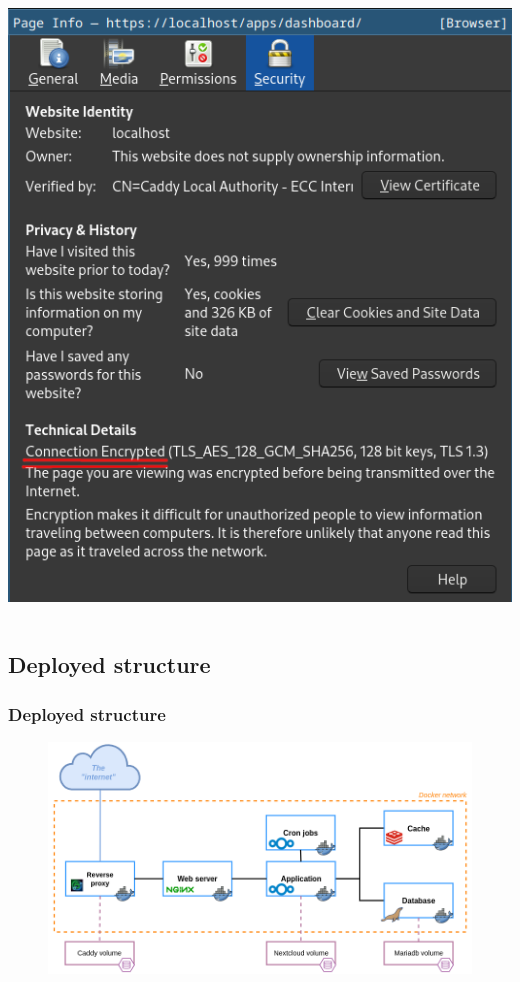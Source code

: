 \documentclass{beamer}
\begin{document}
\begin{frame}
\begin{columns}
\begin{center}
                \vspace{-3em}
                \includegraphics[height=0.45\textheight]{images/other/certificate}
            \end{center}
    \end{columns}
\end{frame}

\subsection{Deployed structure}
\begin{frame}
    \frametitle{Deployed structure}
    \begin{figure}
        \includegraphics[width=\textwidth]{images/other/exbasediagram}
    \end{figure}
\end{frame}
\end{document}
